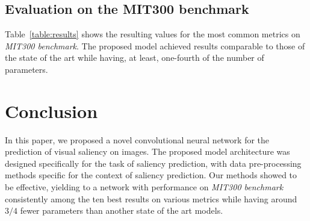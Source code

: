 \documentclass[conference]{IEEEtran}
\begin{document}
\subsection{Evaluation on the MIT300 benchmark}
Table~\ref{table:results} shows the resulting values for the most common
metrics on \emph{MIT300 benchmark}.
The proposed model achieved results comparable to those of the state of
the art while having, at least, one-fourth of the number of parameters.

\section{Conclusion}
In this paper, we proposed a novel convolutional neural network for the
prediction of visual saliency on images.
The proposed model architecture was designed specifically
for the task of saliency prediction, with data pre-processing methods
specific for the context of saliency prediction.
Our methods showed to be effective, yielding to a network with performance
on \emph{MIT300 benchmark} consistently among the ten best results on various
metrics while having around $3/4$  fewer parameters than another state of
the art models.

{\small


}
\end{document}
